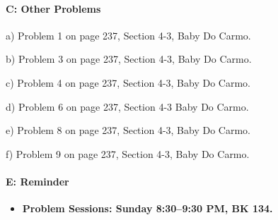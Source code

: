 \documentclass[12pt]{article}
\begin{document}
\paragraph{C: Other Problems}
\begin{itemize}

{\item a) Problem 1 on page 237, Section 4-3, Baby Do Carmo.}
{\item b) Problem 3 on page 237, Section 4-3, Baby Do Carmo.}
{\item c) Problem 4 on page 237,  Section 4-3, Baby Do Carmo.}
{\item d) Problem 6 on page 237,  Section 4-3 Baby Do Carmo.}
{\item e) Problem 8 on page 237,  Section 4-3, Baby Do Carmo.}
{\item f) Problem 9 on page 237,  Section 4-3, Baby Do Carmo.}
\end{itemize}


\paragraph{E: Reminder}
\begin{itemize}
\item{\bf Problem Sessions: Sunday 8:30--9:30 PM, BK 134.}
\end{itemize}
\end{document}
